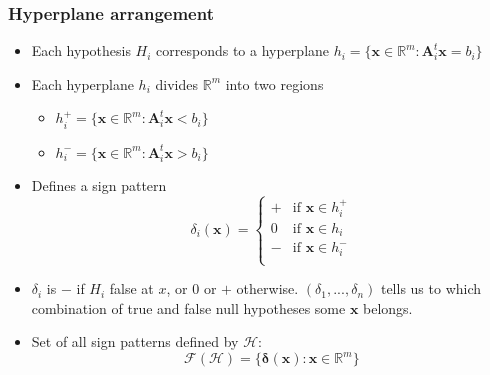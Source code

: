 \documentclass[bigger]{beamer}
\newcommand{\bs}[1]{\bm{#1}}
\newcommand{\R}{\mathbb{R}}
\begin{document}
\begin{frame}
  \frametitle{Hyperplane arrangement}
  \begin{itemize}
  \item Each hypothesis $H_i$ corresponds to a hyperplane $h_i =
    \{\bs{x} \in \mathbb{R}^m: \bs{A}_i^t\bs{x} = b_i\}$
  \item Each hyperplane $h_i$ divides $\mathbb{R}^m$ into two regions
    \begin{itemize}
    \item $h_i^+ = \{\bs{x} \in \mathbb{R}^m: \bs{A}_i^t\bs{x} <
      b_i\}$ 
    \item $h_i^- = \{\bs{x} \in \mathbb{R}^m: \bs{A}_i^t\bs{x}
      > b_i\}$
    \end{itemize}
  \item Defines a sign pattern 
    \begin{equation}
      \label{eq:sign}
      \delta_i(\bs{x}) = \left\{
        \begin{array}{ll}
          + & \text{if } \bs{x} \in h_i^+\\
          0 & \text{if } \bs{x} \in h_i \\
          - & \text{if } \bs{x} \in h_i^-\\
        \end{array}\right.
    \end{equation}
  \item $\delta_i$ is $-$ if $H_i$ false at $x$, or $0$ or $+$
    otherwise. $(\delta_1,...,\delta_n)$ tells us to which combination
    of true and false null hypotheses some $\bs{x}$ belongs. 

  \item Set of all sign patterns defined by $\mathscr{H}$:
    \begin{equation}
      \label{eq:faces}
      \mathcal{F}(\mathscr{H}) = \{\bs{\delta}(\bs{x}): \bs{x} \in \R^m\}
    \end{equation}
  \end{itemize}
\end{frame}
\end{document}
